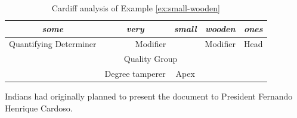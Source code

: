 \begin{table}[!ht]
    \centering
    \begin{tabular}{c|c|c|cc}
        \hline
        \multicolumn{1}{|c|}{\textit{some}}          & \textit{very}     & \textit{small} & \multicolumn{1}{c|}{\textit{wooden}} & \multicolumn{1}{c|}{\textit{ones}} \\ \hline
        \multicolumn{1}{|c|}{Quantifying Determiner} & \multicolumn{2}{c|}{Modifier}      & \multicolumn{1}{c|}{Modifier}        & \multicolumn{1}{c|}{Head}          \\ \hline
        & \multicolumn{2}{c|}{Quality Group} &                                      &                                    \\ \cline{2-3}
        & Degree tamperer & Apex           &                                      &                                    \\ \cline{2-3}
    \end{tabular}
    \caption{Cardiff analysis of Example \ref{ex:small-wooden}}
    \label{tab:example-substructure-analisys-cardiff}
\end{table}


\begin{exe}
    \ex \label{ex:indians-planned} Indians had originally planned to present the document to President Fernando Henrique Cardoso.
\end{exe}


\begin{table}[!ht]
    \centering
    \caption{Sydney grammar Mood analysis of Example \ref{ex:indians-planned}}
    \label{tab:indians-planned-sydney}
\end{table}

